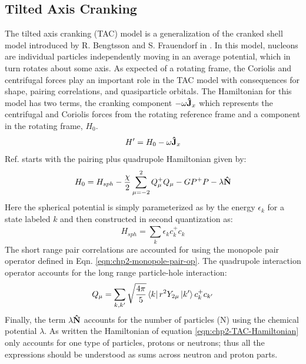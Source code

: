 \subsection{Tilted Axis Cranking}
\label{sec:models-tac}
The tilted axis cranking (TAC) model \cite{frauendorfTAC} is a generalization of the cranked shell model introduced by R. Bengtsson and S. Frauendorf in \cite{crankedShellModelNonPeturbative}. In this model, nucleons are individual particles independently moving in an average potential, which in turn rotates about some axis. As expected of a rotating frame, the Coriolis and centrifugal forces play an important role in the TAC model with consequences for shape, pairing correlations, and quasiparticle orbitals. The Hamiltonian for this model has two terms, the cranking component $-\omega\boldsymbol{\hat{\textbf{J}}}_x$ which represents the centrifugal and Coriolis forces from the rotating reference frame and a component in the rotating frame, $H_0$.
\begin{equation}
\label{eqn:chp2-TAC-Hamiltonian}
H'=H_0-\omega\boldsymbol{\hat{\textbf{J}}}_x
\end{equation}
Ref. \cite{frauendorfTAC} starts with the pairing plus quadrupole Hamiltonian given by:
\begin{equation}
\label{eqn:chp2-TAC-invar-Hamiltonian}
H_0=H_{sph}-\frac{\chi}{2}\sum\limits_{\mu=-2}^{2}Q_{\mu}^+Q_{\mu} - GP^+P-\lambda\boldsymbol{\hat{\textbf{N}}}
\end{equation}
Here the spherical potential is simply parameterized as by the energy $\epsilon_k$ for a state labeled $k$ and then constructed in second quantization as:
\begin{equation}
\label{eqn:chp2-TAC-spherical}
H_{sph}=\sum\limits_{k}^{}\epsilon_kc^+_kc_k
\end{equation}
The short range pair correlations are accounted for using the monopole pair operator defined in Eqn. \ref{eqn:chp2-monopole-pair-op}. The quadrupole interaction operator accounts for the long range particle-hole interaction:
\begin{equation}
\label{eqn:chp2-TAC-quad}
Q_{\mu}=\sum\limits_{k,k'}^{}\sqrt{\frac{4\pi}{5}}\Bra{k}r^2Y_{2\mu}\Ket{k'}c^+_kc_{k'}
\end{equation}
Finally, the term $\lambda\boldsymbol{\hat{\textbf{N}}}$ accounts for the number of particles (N) using the chemical potential $\lambda$. As written the Hamiltonian of equation \ref{eqn:chp2-TAC-Hamiltonian} only accounts for one type of particles, protons or neutrons; thus all the expressions should be understood as sums across neutron and proton parts.


